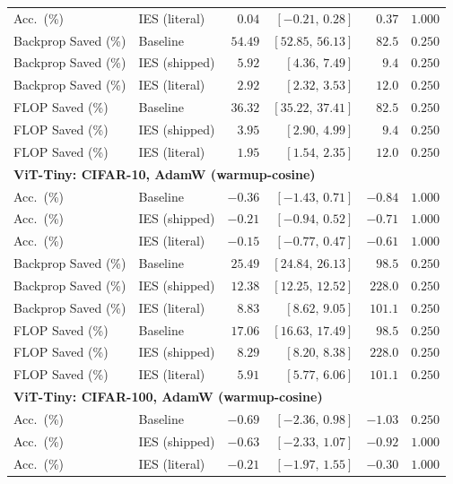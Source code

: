 \documentclass{article}
\newcommand{\win}[1]{\cellcolor{tgwin}#1}
\newcommand{\lose}[1]{\cellcolor{tglose}#1}
\theoremstyle{plain}
\theoremstyle{definition}
\theoremstyle{remark}
\begin{document}
\begin{longtable}{llrrrr}
Acc.\ (\%) & IES (literal) & \win{$0.04$} & $[-0.21,\,0.28]$ & $0.37$ & $1.000$ \\
Backprop Saved (\%) & Baseline & \win{$54.49$} & $[52.85,\,56.13]$ & $82.5$ & $0.250$ \\
Backprop Saved (\%) & IES (shipped) & \win{$5.92$} & $[4.36,\,7.49]$ & $9.4$ & $0.250$ \\
Backprop Saved (\%) & IES (literal) & \win{$2.92$} & $[2.32,\,3.53]$ & $12.0$ & $0.250$ \\
FLOP Saved (\%) & Baseline & \win{$36.32$} & $[35.22,\,37.41]$ & $82.5$ & $0.250$ \\
FLOP Saved (\%) & IES (shipped) & \win{$3.95$} & $[2.90,\,4.99]$ & $9.4$ & $0.250$ \\
FLOP Saved (\%) & IES (literal) & \win{$1.95$} & $[1.54,\,2.35]$ & $12.0$ & $0.250$ \\
\midrule
\multicolumn{6}{l}{\textbf{ViT-Tiny: CIFAR-10, AdamW (warmup-cosine)}} \\
\midrule
Acc.\ (\%) & Baseline & \lose{$-0.36$} & $[-1.43,\,0.71]$ & $-0.84$ & $1.000$ \\
Acc.\ (\%) & IES (shipped) & \lose{$-0.21$} & $[-0.94,\,0.52]$ & $-0.71$ & $1.000$ \\
Acc.\ (\%) & IES (literal) & \lose{$-0.15$} & $[-0.77,\,0.47]$ & $-0.61$ & $1.000$ \\
Backprop Saved (\%) & Baseline & \win{$25.49$} & $[24.84,\,26.13]$ & $98.5$ & $0.250$ \\
Backprop Saved (\%) & IES (shipped) & \win{$12.38$} & $[12.25,\,12.52]$ & $228.0$ & $0.250$ \\
Backprop Saved (\%) & IES (literal) & \win{$8.83$} & $[8.62,\,9.05]$ & $101.1$ & $0.250$ \\
FLOP Saved (\%) & Baseline & \win{$17.06$} & $[16.63,\,17.49]$ & $98.5$ & $0.250$ \\
FLOP Saved (\%) & IES (shipped) & \win{$8.29$} & $[8.20,\,8.38]$ & $228.0$ & $0.250$ \\
FLOP Saved (\%) & IES (literal) & \win{$5.91$} & $[5.77,\,6.06]$ & $101.1$ & $0.250$ \\
\midrule
\multicolumn{6}{l}{\textbf{ViT-Tiny: CIFAR-100, AdamW (warmup-cosine)}} \\
\midrule
Acc.\ (\%) & Baseline & \lose{$-0.69$} & $[-2.36,\,0.98]$ & $-1.03$ & $0.250$ \\
Acc.\ (\%) & IES (shipped) & \lose{$-0.63$} & $[-2.33,\,1.07]$ & $-0.92$ & $1.000$ \\
Acc.\ (\%) & IES (literal) & \lose{$-0.21$} & $[-1.97,\,1.55]$ & $-0.30$ & $1.000$ \\

\end{longtable}
\end{document}
